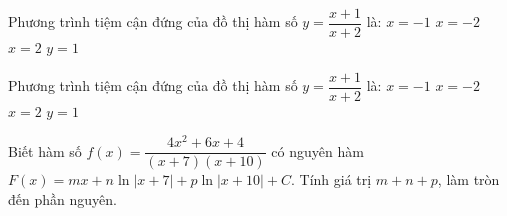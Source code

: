 \documentclass{article}
\begin{document}
\pagestyle{fancy} 
\chantrang{\pageref{LastPage}}{\made}
\caulc
\cauds
\caukq
\begin{ex}
Phương trình tiệm cận đứng của đồ thị hàm số $y=\dfrac{x+1}{x+2}$ là:
\choice
    {$x=-1$}
    {\True $x=-2$}
    {$x=2$}
    {$y=1$}
\end{ex}
\begin{ex}
Phương trình tiệm cận đứng của đồ thị hàm số $y=\dfrac{x+1}{x+2}$ là:
\choiceTFt
    {$x=-1$}
    {\True $x=-2$}
    {$x=2$}
    {$y=1$}
\end{ex}
\begin{ex}
Biết hàm số $f(x)=\dfrac{4x^2 + 6x + 4}{(x + 7)(x + 10)}$ có nguyên hàm $F(x)=mx + n\ln|x + 7| + p\ln|x + 10| + C$. Tính giá trị $m + n + p$, làm tròn đến phần nguyên.
\end{ex}
\end{document}
